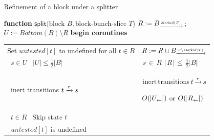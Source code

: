 \documentclass[a4paper,10pt]{article}
\theoremstyle{definition}
\theoremstyle{plain}
\newcommand{\bigo}[1]{{O\!\left(#1\right)}}
\newcommand{\pijl}[1]{\mathrel{\text{$\xrightarrow{\smash[t]{#1}}$}}}
\newcommand{\lijp}[1]{\mathrel{\text{$\xleftarrow{\smash[t]{#1}}$}}}
\newcommand{\size}[1]{\left\lvert #1 \right\rvert}
\newcommand{\Bottom}{\mathit{Bottom}}
\newcommand{\Marked}{\mathit{Marked}}
\newlength{\halflineskip}
\newcommand{\rightbrace}[3][0]{\setlength{\halflineskip}{0.5\baselineskip}\hspace{0pt plus 1filll}\makebox[0pt][l]{\smash{\tikz[baseline=#1\baselineskip]{\draw[thick,color=gray,line cap=round,decorate,decoration={brace,amplitude=2.3pt}] (0pt,0.7\baselineskip) ++(0.1em,0) -- ++(0pt,-#2\baselineskip+1pt) (5pt,\halflineskip-#2\halflineskip) node[color=gray,right,inner sep=0.1em,anchor=base west]{\small #3};}}}}
\begin{document}
\begin{algorithm}[tb]
	\caption{Refinement of a block under a splitter}
	\label{alg:split}
	\small\begin{algorithmic}[1]
	\STATE	\textbf{function} $\mathsf{split}(\text{block } B, \text{block-bunch-slice } T$)
	\STATE \label{alg:line-initRMarked}  $R:=B_{\pijl{\Marked(T)}}$; \quad
	       \label{alg:line-initU} $U := \Bottom(B) \setminus R$
	\STATE	\textbf{begin coroutines} \label{alg:line-after-initU}
		\\[0.18\baselineskip]\setlength{\itemsep}{-0.7\baselineskip}%
	\begin{tabular}{@{}p{5.95cm}||p{4.92cm}@{}}
		\STATE	\hspace*{\algorithmicindent}Set $\mathit{untested}[t]$ to undefined for all $t \mathbin{\in} B$                           & $R:=R \cup B_{\pijl{T \setminus \Marked(T)}}$\label{alg:line-R-union-unmarked-T}\rightbrace[-2]{1}{$\bigo{\size{\Marked(T)}}$}\label{alg:line-initR}\label{alg:line-init-untested}\\
		\STATE	\hspace*{\algorithmicindent}\algorithmicforall\ $s\in U$ \algorithmicwhile\ $\size{U}\leq\frac{1}{2}\size{B}$ \algorithmicdo & \algorithmicforall\,$s\,{\in}\,R$ \algorithmicwhile\,$\size{R}\,{\leq}\,\frac{1}{2}\size{B}$\,\algorithmicdo\rightbrace[-1]{1}{$\bigo{1}$ or $\bigo{\size{R_{\pijl{}}}}$}\\
		\STATE	\hspace*{2\algorithmicindent}\algorithmicforall\ inert transitions $t \pijl{\tau} s$ \algorithmicdo                      & \hspace*{\algorithmicindent}\algorithmicforall\,inert\,transitions\,$t\,{\pijl{\tau}}\,s$ \algorithmicdo\label{alg:line-for-inert-predecessors}\rightbrace[-1]{8}{\parbox[l]{0.3\textwidth}{$\bigo{\size{U_{\lijp{}}}}$ or \\ $\bigo{\size{R_{\lijp{}}}}$}}\\
		\STATE	\hspace*{3\algorithmicindent}\algorithmicif\ $t\in R$ \algorithmicthen\ Skip state $t$\label{alg:line-skip-R-states}      & \\
		\STATE	\hspace*{3\algorithmicindent}\algorithmicif\ $\mathit{untested}[t]$ is undefined \algorithmicthen                         & \\

\end{tabular}
\end{algorithmic}
\end{algorithm}
\end{document}
